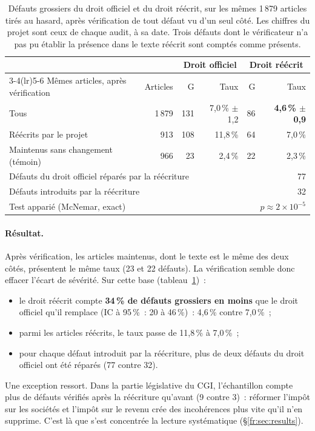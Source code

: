 \documentclass[11pt,a4paper]{article}
\begin{document}
\begin{table}[ht]
\centering
\small
\begin{tabular}{lrrrrr}
\toprule
& & \multicolumn{2}{c}{Droit officiel} & \multicolumn{2}{c}{Droit réécrit}\\
\cmidrule(lr){3-4}\cmidrule(lr){5-6}
Mêmes articles, après vérification & Articles & G & Taux & G & Taux\\
\midrule
Tous & 1\,879 & 131 & 7,0\,\% $\pm$ 1,2 & 86 & \textbf{4,6\,\% $\pm$ 0,9}\\
Réécrits par le projet & 913 & 108 & 11,8\,\% & 64 & 7,0\,\%\\
Maintenus sans changement (témoin) & 966 & 23 & 2,4\,\% & 22 & 2,3\,\%\\
\midrule
\multicolumn{4}{l}{Défauts du droit officiel réparés par la réécriture} & \multicolumn{2}{r}{77}\\
\multicolumn{4}{l}{Défauts introduits par la réécriture} & \multicolumn{2}{r}{32}\\
\multicolumn{4}{l}{Test apparié (McNemar, exact)} & \multicolumn{2}{r}{$p \approx 2\times10^{-5}$}\\
\bottomrule
\end{tabular}
\caption{Défauts grossiers du droit officiel et du droit réécrit, sur les mêmes 1\,879 articles tirés au hasard, après vérification de tout défaut vu d'un seul côté. Les chiffres du projet sont ceux de chaque audit, à sa date. Trois défauts dont le vérificateur n'a pas pu établir la présence dans le texte réécrit sont comptés comme présents.}
\label{fr:tab:baseline}
\end{table}

\paragraph{Résultat.}
Après vérification, les articles maintenus, dont le texte est le même des deux côtés, présentent le même taux (23 et 22 défauts). La vérification semble donc effacer l'écart de sévérité. Sur cette base (tableau~\ref{fr:tab:baseline})~:
\begin{itemize}
  \item le droit réécrit compte \textbf{34\,\% de défauts grossiers en moins} que le droit officiel qu'il remplace (IC à 95\,\%~: 20 à 46\,\%)~: 4,6\,\% contre 7,0\,\%~;
  \item parmi les articles réécrits, le taux passe de 11,8\,\% à 7,0\,\%~;
  \item pour chaque défaut introduit par la réécriture, plus de deux défauts du droit officiel ont été réparés (77 contre 32).
\end{itemize}
Une exception ressort. Dans la partie législative du CGI, l'échantillon compte plus de défauts vérifiés après la réécriture qu'avant (9 contre 3)~: réformer l'impôt sur les sociétés et l'impôt sur le revenu crée des incohérences plus vite qu'il n'en supprime. C'est là que s'est concentrée la lecture systématique (\S\ref{fr:sec:results}).
\end{document}
